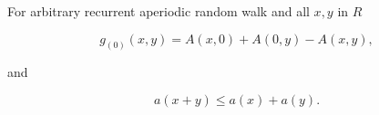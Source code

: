 For arbitrary recurrent aperiodic random walk and all $x,y$ in $R$

$$g_{(0)}(x,y) = A(x,0) + A(0,y) - A(x,y),$$

and

$$a(x + y) \leq a(x) + a(y).$$